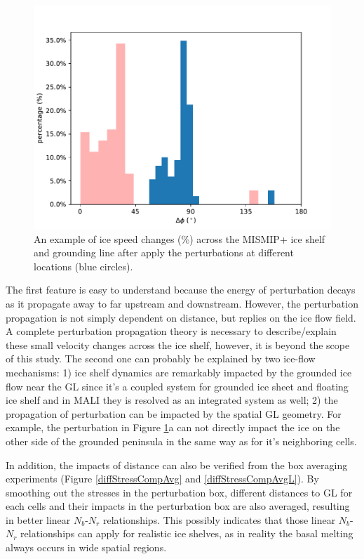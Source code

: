 \documentclass[review,oneside]{igs}
\begin{document}
\begin{figure}
	\centering
	\includegraphics[width=1\linewidth]{figs/perturb_theta_velchange.pdf}
	\caption{An example of ice speed changes (\%) across the MISMIP+ ice shelf and grounding line after apply the perturbations at different locations (blue circles).}
	\label{distPerturbComp}
\end{figure}

The first feature is easy to understand because the energy of perturbation decays as it propagate away to far upstream and downstream. However, the perturbation propagation is not simply dependent on distance, but replies on the ice flow field. A complete perturbation propagation theory is necessary to describe/explain these small velocity changes across the ice shelf, however, it is beyond the scope of this study. The second one can probably be explained by two ice-flow mechanisms: 1) ice shelf dynamics are remarkably impacted by the grounded ice flow near the GL since it's a coupled system for grounded ice sheet and floating ice shelf and in MALI they is resolved as an integrated system as well; 2) the propagation of perturbation can be impacted by the spatial GL geometry. For example, the perturbation in Figure \ref{distPerturbComp}a can not directly impact the ice on the other side of the grounded peninsula in the same way as for it's neighboring cells.

In addition, the impacts of distance can also be verified from the box averaging experiments (Figure \ref{diffStressCompAvg} and \ref{diffStressCompAvgL}). By smoothing out the stresses in the perturbation box, different distances to GL for each cells and their impacts in the perturbation box are also averaged, resulting in better linear $N_b$-$N_r$ relationships. This possibly indicates that those linear $N_b$-$N_r$ relationships can apply for realistic ice shelves, as in reality the basal melting always occurs in wide spatial regions.
\end{document}
